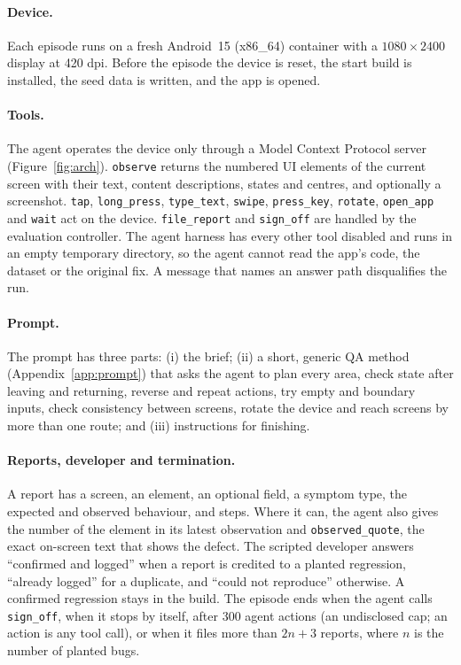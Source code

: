 \documentclass[sigconf]{acmart}
\begin{document}
\paragraph{Device.}
Each episode runs on a fresh Android~15 (x86\_64) container with a $1080\times2400$ display at 420
dpi. Before the episode the device is reset, the start build is installed, the seed data is written,
and the app is opened.

\paragraph{Tools.}
The agent operates the device only through a Model Context Protocol server~\cite{anthropic2024mcp}
(Figure~\ref{fig:arch}). \texttt{observe} returns the numbered UI elements of the current screen with
their text, content descriptions, states and centres, and optionally a screenshot. \texttt{tap},
\texttt{long\_press}, \texttt{type\_text}, \texttt{swipe}, \texttt{press\_key}, \texttt{rotate},
\texttt{open\_app} and \texttt{wait} act on the device. \texttt{file\_report} and \texttt{sign\_off}
are handled by the evaluation controller. The agent harness has every other tool disabled and runs in
an empty temporary directory, so the agent cannot read the app's code, the dataset or the original
fix. A message that names an answer path disqualifies the run.

\paragraph{Prompt.}
The prompt has three parts: (i) the brief; (ii) a short, generic QA method (Appendix~\ref{app:prompt})
that asks the agent to plan every area, check state after leaving and returning, reverse and repeat
actions, try empty and boundary inputs, check consistency between screens, rotate the device and
reach screens by more than one route; and (iii) instructions for finishing.

\paragraph{Reports, developer and termination.}
A report has a screen, an element, an optional field, a symptom type, the expected and observed
behaviour, and steps. Where it can, the agent also gives the number of the element in its latest
observation and \texttt{observed\_quote}, the exact on-screen text that shows the defect. The scripted
developer answers ``confirmed and logged'' when a report is credited to a planted regression,
``already logged'' for a duplicate, and ``could not reproduce'' otherwise. A confirmed regression
stays in the build. The episode ends when the agent calls \texttt{sign\_off}, when it stops by itself,
after 300 agent actions (an undisclosed cap; an action is any tool call), or when it files more than
$2n{+}3$ reports, where $n$ is the number of planted bugs.
\end{document}
